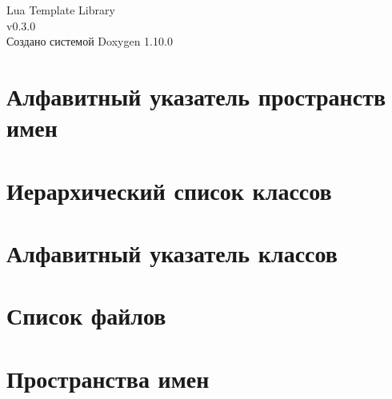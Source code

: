 \documentclass[twoside]{book}
\newcommand{\+}{\discretionary{\mbox{\scriptsize$\hookleftarrow$}}{}{}}
\newcommand{\clearemptydoublepage}{%
    \newpage{\pagestyle{empty}\cleardoublepage}%
  }
\begin{document}
  \raggedbottom
    \hypersetup{pageanchor=false,
                bookmarksnumbered=true,
                pdfencoding=unicode
               }
  \begin{titlepage}
  \vspace*{7cm}
  \begin{center}%
  {\Large Lua Template Library}\\
  [1ex]\large v0.\+3.\+0 \\
  \vspace*{1cm}
  {\large Создано системой Doxygen 1.10.0}\\
  \end{center}
  \end{titlepage}
  \clearemptydoublepage
  \tableofcontents
  \clearemptydoublepage
  \hypersetup{pageanchor=true}

\chapter{Алфавитный указатель пространств имен}

\chapter{Иерархический список классов}

\chapter{Алфавитный указатель классов}

\chapter{Список файлов}

\chapter{Пространства имен}

\end{document}
